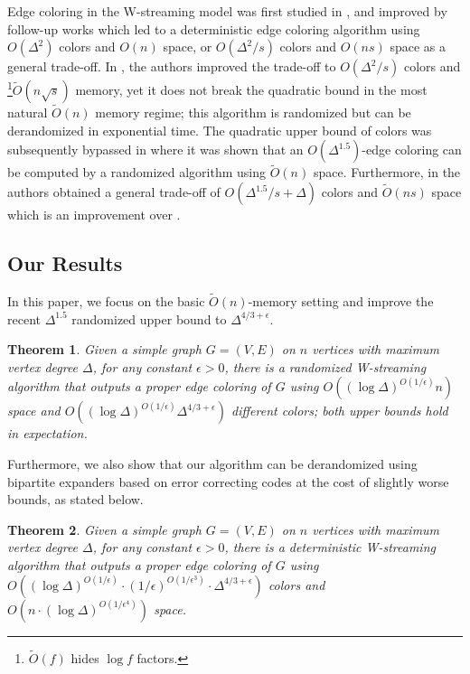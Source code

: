 \documentclass[11pt,a4paper]{article}
\newtheorem{theorem}{Theorem}[section]
\newcommand{\brac}[1]{\left(#1\right)}
\begin{document}
Edge coloring in the W-streaming model was first studied in \cite{behnezhad2019streaming}, and improved by follow-up works \cite{charikar2021improved,ansari2022simple} which led to a deterministic edge coloring algorithm using $O(\Delta^2)$ colors and $O(n)$ space, or $O(\Delta^2/s)$ colors and $O(ns)$ space as a general trade-off. In \cite{ghosh2024low}, the authors improved the trade-off to $O(\Delta^2/s)$ colors and \footnote{$\tilde{O}(f)$ hides $\log f$ factors.}$\tilde{O}(n\sqrt{s})$ memory, yet it does not break the quadratic bound in the most natural $\tilde{O}(n)$ memory regime; this algorithm is randomized but can be derandomized in exponential time. The quadratic upper bound of colors was subsequently bypassed in \cite{behnezhad2023streaming,chechik_et_al:LIPIcs.ICALP.2024.40} where it was shown that an $O(\Delta^{1.5})$-edge coloring can be computed by a randomized algorithm using $\tilde{O}(n)$ space. Furthermore, in \cite{behnezhad2023streaming} the authors obtained a general trade-off of $O(\Delta^{1.5}/s + \Delta)$ colors and $\tilde{O}(ns)$ space which is an improvement over \cite{ghosh2024low}.

\subsection{Our Results}
In this paper, we focus on the basic $\tilde{O}(n)$-memory setting and improve the recent $\Delta^{1.5}$ randomized upper bound to $\Delta^{4/3+\epsilon}$.

\begin{theorem}\label{rand}
    Given a simple graph $G = (V, E)$ on $n$ vertices with maximum vertex degree $\Delta$, for any constant $\epsilon > 0$, there is a randomized W-streaming algorithm that outputs a proper edge coloring of $G$ using $O\brac{(\log\Delta)^{O(1/\epsilon)}n}$ space and $O\brac{(\log\Delta)^{O(1/\epsilon)}\Delta^{4/3+\epsilon}}$ different colors; both upper bounds hold in expectation.
\end{theorem}

Furthermore, we also show that our algorithm can be derandomized using bipartite expanders based on error correcting codes at the cost of slightly worse bounds, as stated below.

\begin{theorem}\label{main}
    Given a simple graph $G = (V, E)$ on $n$ vertices with maximum vertex degree $\Delta$, for any constant $\epsilon > 0$, there is a deterministic W-streaming algorithm that outputs a proper edge coloring of $G$ using $O\brac{(\log\Delta)^{O(1 / \epsilon)}\cdot(1/\epsilon)^{O(1/\epsilon^3)}\cdot \Delta^{4/3+\epsilon}}$ colors and $O\brac{n\cdot (\log \Delta)^{O(1 / \epsilon^4)}}$ space.
\end{theorem}
\end{document}
